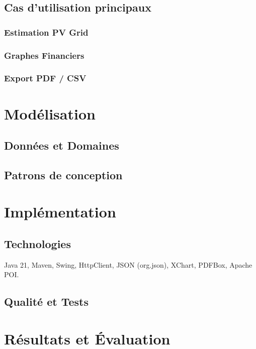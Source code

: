 \documentclass[11pt,a4paper]{report}
\begin{document}
\section{Cas d'utilisation principaux}
\subsection{Estimation PV Grid}
\subsection{Graphes Financiers}
\subsection{Export PDF / CSV}

\chapter{Modélisation}
\section{Données et Domaines}
\section{Patrons de conception}

\chapter{Implémentation}
\section{Technologies}
Java 21, Maven, Swing, HttpClient, JSON (org.json), XChart, PDFBox, Apache POI.
\section{Qualité et Tests}

\chapter{Résultats et Évaluation}
\end{document}
